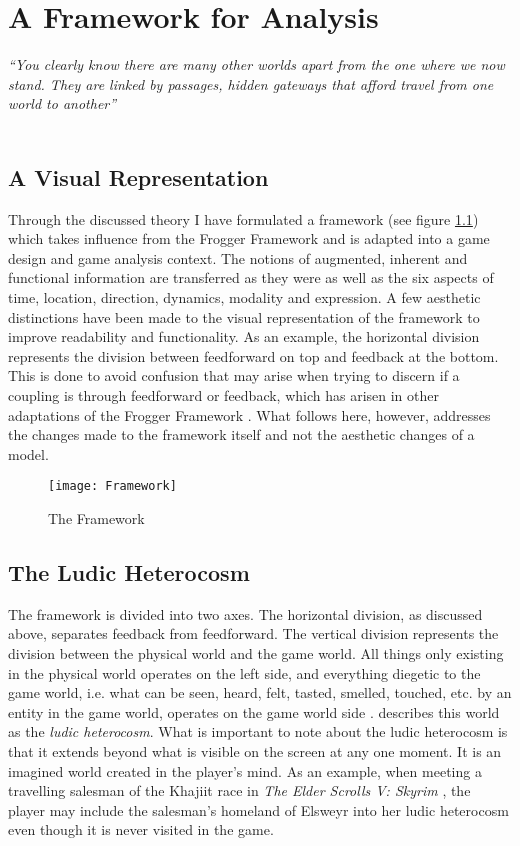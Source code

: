 \chapter{A Framework for Analysis}
\textit{``You clearly know there are many other worlds apart from the one where we now stand. They are linked by passages, hidden gateways that afford travel from one world to another''} \\
 \\

\section{A Visual Representation}
Through the discussed theory I have formulated a framework (see figure \ref{framework}) which takes influence from the Frogger Framework \cite{frogger} and is adapted into a game design and game analysis context. The notions of augmented, inherent and functional information are transferred as they were as well as the six aspects of time, location, direction, dynamics, modality and expression. A few aesthetic distinctions have been made to the visual representation of the framework to improve readability and functionality. As an example, the horizontal division represents the division between feedforward on top and feedback at the bottom. This is done to avoid confusion that may arise when trying to discern if a coupling is through feedforward or feedback, which has arisen in other adaptations of the Frogger Framework \cite{tangifrog}. What follows here, however, addresses the changes made to the framework itself and not the aesthetic changes of a model.

\begin{figure}
  \texttt{[image: Framework]}
  \caption{The Framework}
  \label{framework}
\end{figure}

\section{The Ludic Heterocosm}
The framework is divided into two axes. The horizontal division, as discussed above, separates feedback from feedforward. The vertical division represents the division between the physical world and the game world. All things only existing in the physical world operates on the left side, and everything diegetic to the game world, i.e. what can be seen, heard, felt, tasted, smelled, touched, etc. by an entity in the game world, operates on the game world side \cite{bordwell}.  describes this world as the \textit{ludic heterocosm}. What is important to note about the ludic heterocosm is that it extends beyond what is visible on the screen at any one moment. It is an imagined world created in the player's mind. As an example, when meeting a travelling salesman of the Khajiit race in \textit{The Elder Scrolls V: Skyrim} \cite{skyrim}, the player may include the salesman's homeland of Elsweyr into her ludic heterocosm even though it is never visited in the game.

